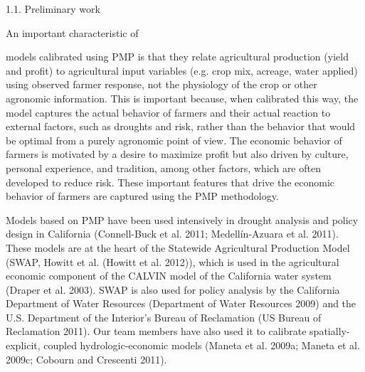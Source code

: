 


1.1. Preliminary work 


An important characteristic of 


models calibrated using PMP is that they relate agricultural production (yield and profit) to agricultural input variables (e.g. crop mix, acreage, water applied) using observed farmer response, not the physiology of the crop or other agronomic information. This is important because, when calibrated this way, the model captures the actual behavior of farmers and their actual reaction to external factors, such as droughts and risk, rather than the behavior that would be optimal from a purely agronomic point of view. The economic behavior of farmers is motivated by a desire to maximize profit but also driven by culture, personal experience, and tradition, among other factors, which are often developed to reduce risk. These important features that drive the economic behavior of farmers are captured using the PMP methodology. 

Models based on PMP have been used intensively in drought analysis and policy design in California (Connell-Buck et al. 2011; Medellín-Azuara et al. 2011). These models are at the heart of the Statewide Agricultural Production Model (SWAP, Howitt et al. (Howitt et al. 2012)), which is used in the agricultural economic component of the CALVIN model of the California water system (Draper et al. 2003). SWAP is also used for policy analysis by the California Department of Water Resources (Department of Water Resources 2009) and the U.S. Department of the Interior’s Bureau of Reclamation (US Bureau of Reclamation 2011). Our team members have also used it to calibrate spatially-explicit, coupled hydrologic-economic models (Maneta et al. 2009a; Maneta et al. 2009c; Cobourn and Crescenti 2011). 

